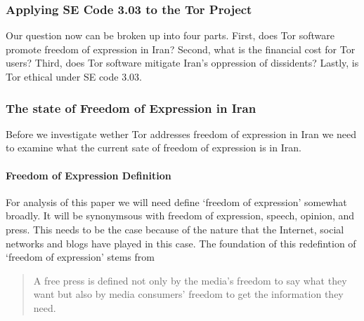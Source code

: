 \documentclass[11pt]{article}
\begin{document}
\begin{multicols}{2}

\subsubsection{Applying SE Code 3.03 to the Tor Project}

\newline

Our question now can be broken up into four parts. First, does Tor software
promote freedom of expression in Iran? Second, what is the financial cost for
Tor users?  Third, does Tor software mitigate Iran's oppression of dissidents?
Lastly, is Tor ethical under SE code 3.03.

\subsubsection{The state of Freedom of Expression in Iran}
Before we investigate wether Tor addresses freedom of expression in Iran we need
to examine what the current sate of freedom of expression is in Iran. 

\paragraph{Freedom of Expression Definition}

For analysis of this paper we will need define `freedom of expression' somewhat
broadly. It will be synonymsous with freedom of expression, speech, opinion, and
press.  This needs to be the case because of the nature that the Internet,
social networks and blogs have played in this case. The foundation of this
redefintion of `freedom of expression' stems from 
\begin{quotation} 
  A free press is defined not only by the media's freedom to say what they want
  but also by media consumers' freedom to get the information they need.
  \cite{PublicAttitudeTowardFreedomPress, ComplexRoadToHappiness}
\end{quotation}


\end{multicols}
\end{document}
